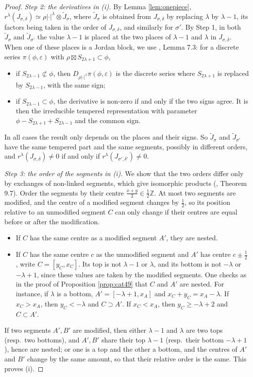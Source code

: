 \documentclass[a4paper,12pt,leqno]{amsart}
\theoremstyle{plain}
\theoremstyle{definition}
\providecommand{\bbZ}{\mathbb{Z}}\providecommand{\bbC}{\mathbb{C}}\providecommand{\Id}{\mathrm{Id}}\providecommand{\Irr}{\mathbf{Irr}}\providecommand{\Alg}{\mathrm{Alg}}
\begin{document}
\begin{proof}
\emph{Step 2: the derivatives in (i).} By Lemma \ref{lem:onepiece},
$r^\lambda(J_{\sigma,\delta})\simeq\rho|\cdot|^\lambda\otimes\widetilde J_\sigma$, where $\widetilde J_\sigma$ is
obtained from $J_{\sigma,\delta}$ by replacing $\lambda$ by $\lambda-1$, its factors being taken in the
order of $J_{\sigma,\delta}$, and similarly for $\sigma'$. By Step 1, in both $\widetilde J_\sigma$ and
$\widetilde J_{\sigma'}$ the value $\lambda-1$ is placed at the two places of $\lambda-1$ and $\lambda$ in
$J_{\sigma,\delta}$. When one of these places is a Jordan block, we use \cite{Xu17}, Lemma 7.3: for a
discrete series $\pi(\phi,\varepsilon)$ with $\rho\boxtimes S_{2\lambda+1}\subset\phi$,
\begin{itemize}
\item if $S_{2\lambda-1}\not\subset\phi$, then $D_{\rho|\cdot|^\lambda}\pi(\phi,\varepsilon)$ is
the discrete series where $S_{2\lambda+1}$ is replaced by $S_{2\lambda-1}$, with the same sign;
\item if $S_{2\lambda-1}\subset\phi$, the derivative is non-zero if and only if the two signs agree.
It is then the irreducible tempered representation with parameter
$\phi-S_{2\lambda+1}+S_{2\lambda-1}$ and the common sign.
\end{itemize}
In all cases the result only depends on the places and their signs. So $\widetilde J_\sigma$ and
$\widetilde J_{\sigma'}$ have the same tempered part and the same segments, possibly in different
orders, and $r^\lambda(J_{\sigma,\delta})\neq0$ if and only if $r^\lambda(J_{\sigma',\delta'})\neq0$.

\emph{Step 3: the order of the segments in (i).} We show that the two orders differ only by exchanges
of non-linked segments, which give isomorphic products (\cite{Zel80}, Theorem 9.7). Order the segments by
their centre $\frac{x+y}2\in\frac12\bbZ$. At most two segments are modified, and the centre of a modified
segment changes by $\frac12$, so its position relative to an unmodified segment $C$ can only change if
their centres are equal before or after the modification.
\begin{itemize}
\item If $C$ has the same centre as a modified segment $A'$, they are nested.
\item If $C$ has the same centre $c$ as the unmodified segment and $A'$ has centre $c\pm\frac12$, write
$C=[y_C,x_C]$. Its top is not $\lambda-1$ or $\lambda$, and its bottom is not $-\lambda$ or
$-\lambda+1$, since these values are taken by the modified segments. One checks as in the proof
of Proposition \ref{prop:cat49} that $C$ and $A'$ are nested. For instance, if $\lambda$ is a bottom,
$A'=[-\lambda+1,x_A]$ and $x_C+y_C=x_A-\lambda$. If $x_C>x_A$, then $y_C<-\lambda$ and
$C\supset A'$. If $x_C<x_A$, then $y_C\geq-\lambda+2$ and $C\subset A'$.
\end{itemize}
If two segments $A',B'$ are modified, then either $\lambda-1$ and $\lambda$ are two tops (resp.\ two
bottoms), and $A',B'$ share their top $\lambda-1$ (resp.\ their bottom $-\lambda+1$), hence are nested; or
one is a top and the other a bottom, and the centres of $A'$ and $B'$ change by the same amount, so that
their relative order is the same. This proves (i).


\end{proof}
\end{document}
